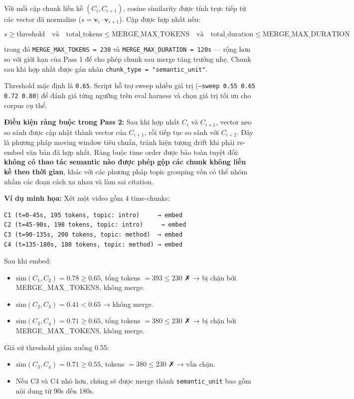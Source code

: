 Với mỗi cặp chunk liền kề $(C_i, C_{i+1})$, cosine similarity được tính trực tiếp từ các vector đã normalize ($s = \mathbf{v}_i \cdot \mathbf{v}_{i+1}$). Cặp được hợp nhất nếu:

\[
s \geq \text{threshold} \quad \text{và} \quad
\text{total\_tokens} \leq \text{MERGE\_MAX\_TOKENS} \quad \text{và} \quad
\text{total\_duration} \leq \text{MERGE\_MAX\_DURATION}
\]

trong đó \texttt{MERGE\_MAX\_TOKENS = 230} và \texttt{MERGE\_MAX\_DURATION = 120s} — rộng hơn so với giới hạn của Pass 1 để cho phép chunk sau merge tăng trưởng nhẹ. Chunk sau khi hợp nhất được gán nhãn \texttt{chunk\_type = "semantic\_unit"}.

Threshold mặc định là \texttt{0.65}. Script hỗ trợ sweep nhiều giá trị (\texttt{--sweep 0.55 0.65 0.72 0.80}) để đánh giá từng ngưỡng trên eval harness và chọn giá trị tối ưu cho corpus cụ thể.

\textbf{Điều kiện ràng buộc trong Pass 2:} Sau khi hợp nhất $C_i$ và $C_{i+1}$, vector neo so sánh được cập nhật thành vector của $C_{i+1}$, rồi tiếp tục so sánh với $C_{i+2}$. Đây là phương pháp moving window tiêu chuẩn, tránh hiện tượng drift khi phải re-embed văn bản đã hợp nhất. Ràng buộc time order được bảo toàn tuyệt đối: \textbf{không có thao tác semantic nào được phép gộp các chunk không liền kề theo thời gian}, khác với các phương pháp topic grouping vốn có thể nhóm nhầm các đoạn cách xa nhau và làm sai citation.

\textbf{Ví dụ minh họa:} Xét một video gồm 4 time-chunks:

\begin{verbatim}
C1 (t=0-45s, 195 tokens, topic: intro)     → embed
C2 (t=45-90s, 198 tokens, topic: intro)     → embed
C3 (t=90-135s, 200 tokens, topic: method)  → embed
C4 (t=135-180s, 180 tokens, topic: method) → embed
\end{verbatim}

Sau khi embed:
\begin{itemize}
    \item $\text{sim}(C_1, C_2) = 0.78 \geq 0.65$, tổng tokens $= 393 \leq 230$ ✗ → bị chặn bởi MERGE\_MAX\_TOKENS, không merge.
    \item $\text{sim}(C_2, C_3) = 0.41 < 0.65$ → không merge.
    \item $\text{sim}(C_3, C_4) = 0.71 \geq 0.65$, tổng tokens $= 380 \leq 230$ ✗ → bị chặn bởi MERGE\_MAX\_TOKENS, không merge.
\end{itemize}

Giả sử threshold giảm xuống 0.55:
\begin{itemize}
    \item $\text{sim}(C_3, C_4) = 0.71 \geq 0.55$, tokens $= 380 \leq 230$ ✗ → vẫn chặn.
    \item Nếu C3 và C4 nhỏ hơn, chúng sẽ được merge thành \texttt{semantic\_unit} bao gồm nội dung từ 90s đến 180s.
\end{itemize}

